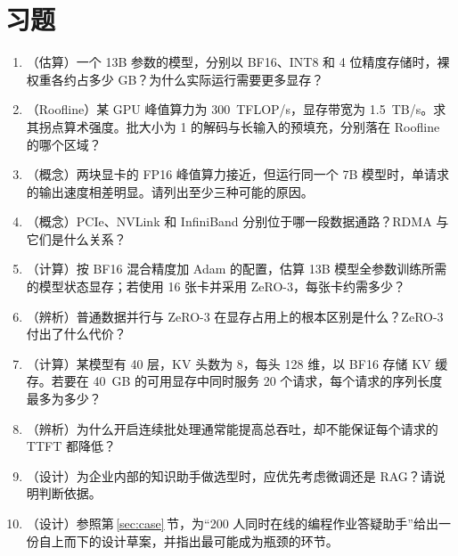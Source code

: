 \section*{习题}

\begin{enumerate}[label=\thechapter.\arabic*,leftmargin=2.6em,itemsep=4pt]
  \item （估算）一个 13B 参数的模型，分别以 BF16、INT8 和 4 位精度存储时，裸权重各约占多少 GB？为什么实际运行需要更多显存？
  \item （Roofline）某 GPU 峰值算力为 \SI{300}{TFLOP/s}，显存带宽为 \SI{1.5}{TB/s}。求其拐点算术强度。批大小为 1 的解码与长输入的预填充，分别落在 Roofline 的哪个区域？
  \item （概念）两块显卡的 FP16 峰值算力接近，但运行同一个 7B 模型时，单请求的输出速度相差明显。请列出至少三种可能的原因。
  \item （概念）PCIe、NVLink 和 InfiniBand 分别位于哪一段数据通路？RDMA 与它们是什么关系？
  \item （计算）按 BF16 混合精度加 Adam 的配置，估算 13B 模型全参数训练所需的模型状态显存；若使用 16 张卡并采用 ZeRO-3，每张卡约需多少？
  \item （辨析）普通数据并行与 ZeRO-3 在显存占用上的根本区别是什么？ZeRO-3 付出了什么代价？
  \item （计算）某模型有 40 层，KV 头数为 8，每头 128 维，以 BF16 存储 KV 缓存。若要在 \SI{40}{GB} 的可用显存中同时服务 20 个请求，每个请求的序列长度最多为多少？
  \item （辨析）为什么开启连续批处理通常能提高总吞吐，却不能保证每个请求的 TTFT 都降低？
  \item （设计）为企业内部的知识助手做选型时，应优先考虑微调还是 RAG？请说明判断依据。
  \item （设计）参照第\,\ref{sec:case}\,节，为“200 人同时在线的编程作业答疑助手”给出一份自上而下的设计草案，并指出最可能成为瓶颈的环节。
\end{enumerate}


